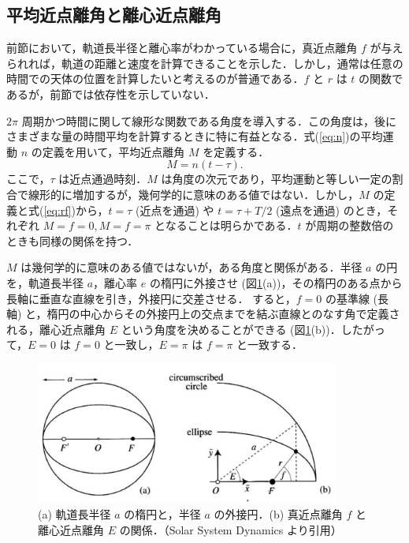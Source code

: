 \documentclass[11pt,a4paper,oneside,onecolumn]{jreport}
\begin{document}
\subsection{平均近点離角と離心近点離角}
前節において，軌道長半径と離心率がわかっている場合に，真近点離角 $f$ が与えられれば，軌道の距離と速度を計算できることを示した．しかし，通常は任意の時間での天体の位置を計算したいと考えるのが普通である．$f$ と $r$ は $t$ の関数であるが，前節では依存性を示していない．

$2 \pi$ 周期かつ時間に関して線形な関数である角度を導入する．この角度は，後にさまざまな量の時間平均を計算するときに特に有益となる．式(\ref{eq:n})の平均運動 $n$ の定義を用いて，平均近点離角 $M$ を定義する．
\begin{equation}
M = n (t - \tau). \label{eq:M}
\end{equation}
ここで，$\tau$ は近点通過時刻．$M$ は角度の次元であり，平均運動と等しい一定の割合で線形的に増加するが，幾何学的に意味のある値ではない．しかし，$M$ の定義と式(\ref{eq:rf})から，$t = \tau$ (近点を通過) や $t = \tau + T / 2$ (遠点を通過) のとき，それぞれ $M = f =0, M = f = \pi$ となることは明らかである．$t$ が周期の整数倍のときも同様の関係を持つ．

$M$ は幾何学的に意味のある値ではないが，ある角度と関係がある．半径 $a$ の円を，軌道長半径 $a$，離心率 $e$ の楕円に外接させ (図\ref{fig:Ef}(a))，その楕円のある点から長軸に垂直な直線を引き，外接円に交差させる． すると，$f = 0$ の基準線 (長軸) と，楕円の中心からその外接円上の交点までを結ぶ直線とのなす角で定義される，離心近点離角 $E$ という角度を決めることができる (図\ref{fig:Ef}(b))．したがって，$E = 0$ は $f = 0$ と一致し，$E = \pi$ は $f = \pi$ と一致する．

\begin{figure}[H]
\centering
\includegraphics[width=10cm]{./image/sec2_7.pdf}
\caption{(a) 軌道長半径 $a$ の楕円と，半径 $a$ の外接円．(b) 真近点離角 $f$ と離心近点離角 $E$ の関係．（Solar System Dynamics\cite{SSD} より引用）\label{fig:Ef}}
\end{figure}
\end{document}
